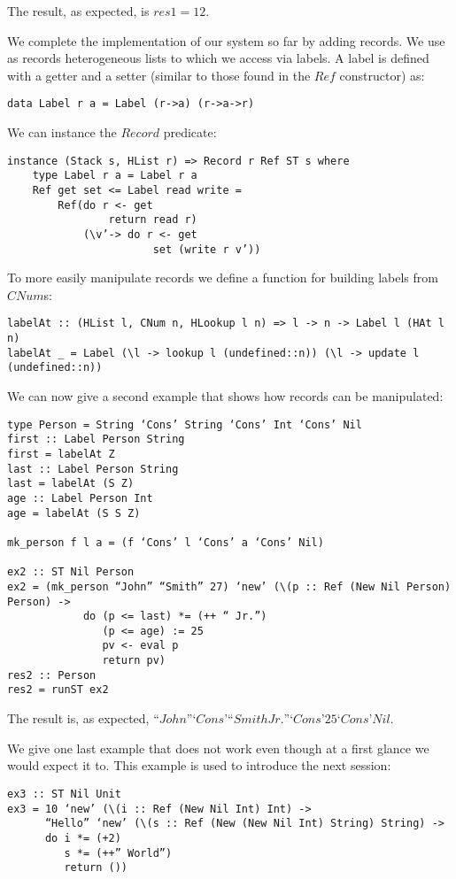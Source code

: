 The result, as expected, is $res1=12$.


We complete the implementation of our system so far by adding records. We use as records heterogeneous lists to which we access via labels. A label is defined with a getter and a setter (similar to those found in the $Ref$ constructor) as:
\begin{verbatim}
data Label r a = Label (r->a) (r->a->r)
\end{verbatim}

We can instance the $Record$ predicate:
\begin{verbatim}
instance (Stack s, HList r) => Record r Ref ST s where
	type Label r a = Label r a
	Ref get set <= Label read write =
		Ref(do r <- get
				return read r)
			(\v’-> do r <- get
					   set (write r v’))
\end{verbatim}

To more easily manipulate records we define a function for building labels from $CNum$s:
\begin{verbatim}
labelAt :: (HList l, CNum n, HLookup l n) => l -> n -> Label l (HAt l n)
labelAt _ = Label (\l -> lookup l (undefined::n)) (\l -> update l (undefined::n))
\end{verbatim}

We can now give a second example that shows how records can be manipulated:
\begin{verbatim}
type Person = String ‘Cons’ String ‘Cons’ Int ‘Cons’ Nil
first :: Label Person String
first = labelAt Z
last :: Label Person String
last = labelAt (S Z)
age :: Label Person Int
age = labelAt (S S Z)

mk_person f l a = (f ‘Cons’ l ‘Cons’ a ‘Cons’ Nil)

ex2 :: ST Nil Person
ex2 = (mk_person “John” “Smith” 27) ‘new’ (\(p :: Ref (New Nil Person) Person) ->
			do (p <= last) *= (++ “ Jr.”)
			   (p <= age) := 25
			   pv <- eval p
			   return pv)
res2 :: Person
res2 = runST ex2
\end{verbatim}
The result is, as expected, $“John” ‘Cons’ “Smith Jr.” ‘Cons’ 25 ‘Cons’ Nil$.

We give one last example that does not work even though at a first glance we would expect it to. This example is used to introduce the next session:
\begin{verbatim}
ex3 :: ST Nil Unit
ex3 = 10 ‘new’ (\(i :: Ref (New Nil Int) Int) ->
	  “Hello” ‘new’ (\(s :: Ref (New (New Nil Int) String) String) ->
	  do i *= (+2)
		 s *= (++” World”)
		 return ())
\end{verbatim}

